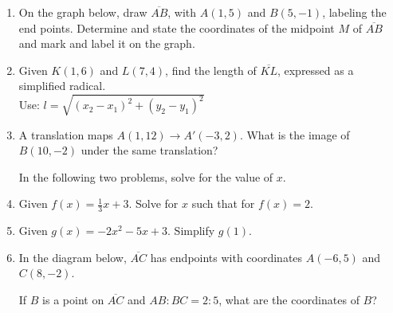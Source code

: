 \documentclass[12pt, twoside]{article}
\begin{document}
\begin{enumerate}
\item On the graph below, draw $\overline{AB}$, with $A(1,5)$ and $B(5,-1)$, labeling the end points. Determine and state the coordinates of the midpoint $M$ of $\overline{AB}$ and mark and label it on the graph.
\begin{flushleft}
\end{flushleft}

\item Given $K(1,6)$ and $L(7,4)$, find the length of $\overline{KL}$, expressed as a simplified radical.\\[0.25cm]
Use: $l=\sqrt{(x_2-x_1)^2+(y_2-y_1)^2}$
    \vspace{4cm}

\newpage
\item A translation maps $A(1,12) \rightarrow A'(-3,2)$. What is the image of $B(10,-2)$ under the same translation?  \vspace{3cm}

In the following two problems, solve for the value of $x$.
\vspace{4cm}

\item Given $f(x)=\frac{1}{3} x+3$. Solve for $x$ such that for $f(x)=2$. \vspace{4cm}
\item Given $g(x)=-2x^2-5x+3$. Simplify $g(1)$. \vspace{2cm}

\newpage
\item In the diagram below, $\overline{AC}$ has endpoints with coordinates $A(-6,5)$ and $C(8, -2)$.
  \begin{center} %
  \end{center}
  If $B$ is a point on $\overline{AC}$ and $AB {:} BC = 2{:}5$,  what  are  the coordinates of $B$? \vspace{4cm}
  

\end{enumerate}
\end{document}
